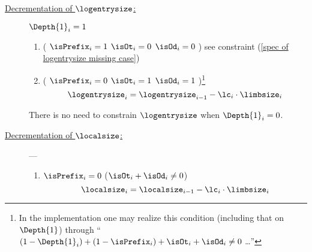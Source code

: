 		\begin{description}
			\item[\underline{Decrementation of $\logentrysize$:}] \label{spec of logentrysize} \If $\Depth{1}_{i}=1$ \Then
				\begin{enumerate}
					\item \If \Big(
						$\isPrefix_{i} = 1$
						\et $\isOt_{i} = 0$
						\et $\isOd_{i} = 0$
						\Big) \Then see constraint (\ref{spec of logentrysize missing case})
					\item \If \Big(
						$\isPrefix_{i} = 0$
						\Or $\isOt_{i} = 1$
						\Or $\isOd_{i} = 1$
						\Big)\footnote{In the implementation one may realize this condition (including that on $\Depth{1}$) through
						``\If $(1 - \Depth{1}_{i})
						+ (1 - \isPrefix_{i})
						+ \isOt_{i}
						+ \isOd_{i} \neq 0$ \Then \dots{}''} \Then
						\[
							\logentrysize_{i} = \logentrysize_{i-1} - \lc_{i} \cdot \limbsize_{i}
						\]
				\end{enumerate}
				\saNote{} There is no need to constrain $\logentrysize$ when $\Depth{1}_{i}=0$.
			\item[\underline{Decrementation of $\localsize$:}] ---
				\begin{enumerate}
					\item \If $\isPrefix_{i}=0$ \et ($\isOt_{i} + \isOd_{i} \neq 0$) \Then
						\[ \localsize_{i} = \localsize_{i-1} - \lc_{i} \cdot \limbsize_{i} \]
				\end{enumerate}
		\end{description}
